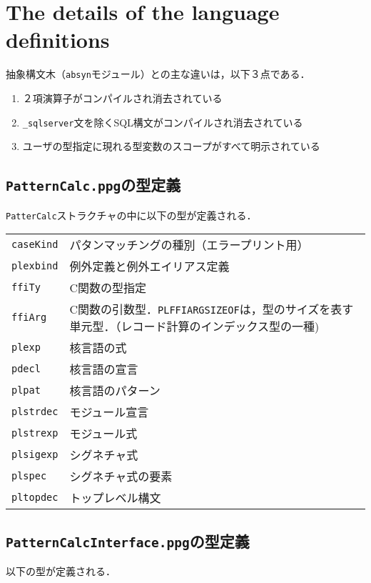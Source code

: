 \documentclass{jbook}
\newcommand{\txt}[2]{#2}
\newcommand{\code}[1]{\mbox{\large\tt #1}}
\begin{document}
\section{\txt{中間言語定義の詳細}{The details of the language definitions}}
\ifjp%
	抽象構文木（\code{absyn}モジュール）との主な違いは，以下３点である．
\begin{enumerate}
\item ２項演算子がコンパイルされ消去されている
\item \code{\_sqlserver}文を除くSQL構文がコンパイルされ消去されている
\item ユーザの型指定に現れる型変数のスコープがすべて明示されている
\end{enumerate}

\subsection{\code{PatternCalc.ppg}の型定義}
	\code{PatterCalc}ストラクチャの中に以下の型が定義される．

\begin{tabular}{ll}
\code{caseKind} & パタンマッチングの種別（エラープリント用）
\\
\code{plexbind} & 例外定義と例外エイリアス定義
\\
\code{ffiTy} & C関数の型指定
\\
\code{ffiArg} & C関数の引数型．\code{PLFFIARGSIZEOF}は，型のサイズを表す
単元型．（レコード計算のインデックス型の一種)
\\
\code{plexp} & 核言語の式
\\
\code{pdecl} & 核言語の宣言
\\
\code{plpat} & 核言語のパターン
\\
\code{plstrdec} & モジュール宣言
\\
\code{plstrexp} & モジュール式
\\
\code{plsigexp} & シグネチャ式
\\
\code{plspec} & シグネチャ式の要素
\\
\code{pltopdec} & トップレベル構文
\end{tabular}

\subsection{\code{PatternCalcInterface.ppg}の型定義}
	以下の型が定義される．
\end{document}
